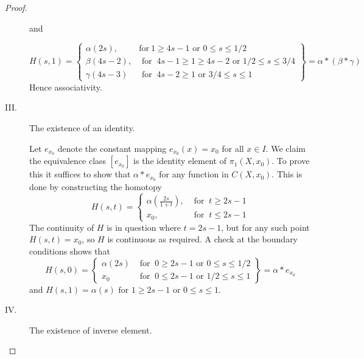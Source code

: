 \begin{proof}
\begin{description}
and

\[
H(s,1)=\left\{\begin{array}{lr}
\alpha(2s),&\text{for}\ 1\geq 4s-1 \text{ or } 0\leq s\leq1/2\\
\beta(4s-2),&\mbox{ for }\ 4s-1\geq 1\geq 4s-2 \text{ or } 1/2\leq s\leq 3/4\\
\gamma(4s-3)&\mbox{ for }\ 4s-2\geq 1 \text{ or } 3/4\leq s\leq 1
\end{array}\right\}=\alpha\ast(\beta\ast\gamma)
\]
Hence associativity.
  \item[III.] The existence of an identity.

Let $e_{x_0}$ denote the constant mapping $e_{x_0}(x)=x_0$ for all $x\in I$. We claim the equivalence class $[e_{x_0}]$ is the identity element of $\pi_1(X,x_0)$. To prove this it suffices to show that $\alpha\ast e_{x_0}$ for any function in $C(X,x_0)$. This is done by constructing the homotopy
$$
H(s,t)=
\begin{cases}
\alpha(\frac{2s}{1+t}),&\mbox{ for }\ t\geq 2s-1\\
x_0,&\mbox{ for }\  t\leq 2s-1
\end{cases}
$$
The continuity of $H$ is in question where $t=2s-1$, but for any such point $H(s,t)=x_0$, so $H$ is continuous as required. A check at the boundary conditions shows that
\[ H(s,0) = \left\{\begin{array}{lr}
        \alpha(2s) & \text{ for }\ 0\ge 2s-1 \text{ or } 0\leq s\leq 1/2 \\
        x_0 & \text{ for }\ 0\leq 2s-1 \text{ or } 1/2\leq s\leq 1
        \end{array}\right\} = \alpha\ast e_{x_0}
\]
and $H(s,1)=\alpha(s) \text{ for } 1\ge 2s-1 \text{ or } 0\leq s\leq 1.$
  \item[IV.] The existence of inverse element.


\end{description}
\end{proof}
